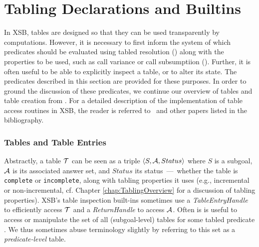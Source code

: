 
\newcommand{\retn}{\code{ret/n}}


\section{Tabling Declarations and Builtins} \label{sec:TablingPredicates}

In XSB, tables are designed so that they can be used transparently by
computations.  However, it is necessary to first inform the system of
which predicates should be evaluated using tabled resolution
() along with the properties to be used,
such as call variance or call subsumptiion
().  Further, it is often useful to be
able to explicitly inspect a table, or to alter its state.  The
predicates described in this section are provided for these purposes.
In order to ground the discussion of these predicates, we continue our
overview of tables and table creation from
.  For a detailed description of the
implementation of table access routines in XSB, the reader is referred
to~\cite{RRSSW98,TST99,CuSW99b,Swif14} and other papers listed in the
bibliography.


\subsubsection*{Tables and Table Entries}

Abstractly, a table ${\cal T}$ can be seen as a triple $\langle
S,{\cal A},Status \rangle$ where $S$ is a subgoal, ${\cal A}$ is its associated
answer set, and $Status$ its status~---~whether the table is
\texttt{complete} or \texttt{incomplete}, along with tabling
properties it uses (e.g., incremental or non-incremental, cf. Chapter
\ref{chap:TablingOverview} for a discussion of tabling properties).
XSB's table inspection built-ins sometimes use a {\em
  TableEntryHandle} to efficiently access ${\cal T}$ and a {\em
  ReturnHandle} to access ${\cal A}$.  Often is is useful to access or
manipulate the set of all (subgoal-level) tables for some tabled
predicate .  We thus sometimes abuse terminology slightly by
referring to this set as a {\em predicate-level} table.

